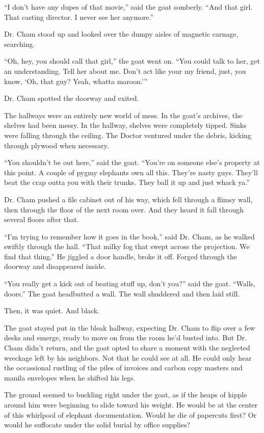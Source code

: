 \documentclass[12pt,twoside]{report}
\begin{document}
``I don't have any dupes of that movie,'' said the goat somberly.
``And that girl.  That casting director.  I never see her anymore.''

Dr. Cham stood up and looked over the dumpy aisles of magnetic
carnage, searching.

``Oh, hey, you should call that girl,'' the goat went on. ``You could
talk to her, get an understanding. Tell her about me.  Don't act like
your my friend, just, you know, `Oh, that guy? Yeah, whatta maroon.'''

Dr. Cham spotted the doorway and exited.

The hallways were an entirely new world of mess.  In the goat's
archives, the shelves had been messy. In the hallway, shelves were
completely tipped.  Sinks were falling through the ceiling.  The
Doctor ventured under the debris, kicking through plywood when
necessary.

``You shouldn't be out here,'' said the goat.  ``You're on someone
else's property at this point. A couple of pygmy elephants own all
this.  They're nasty guys.  They'll beat the crap outta you with their
trunks.  They ball it up and just whack ya.''

Dr. Cham pushed a file cabinet out of his way, which fell through a
flimsy wall, then through the floor of the next room over.  And they
heard it fall through several floors after that.

``I'm trying to remember how it goes in the book,'' said Dr. Cham, as
he walked swiftly through the hall.  ``That milky fog that swept
across the projection.  We find that thing.''  He jiggled a door
handle, broke it off.  Forged through the doorway and disappeared
inside.

``You really get a kick out of beating stuff up, don't you?'' said the
goat.  ``Walls, doors.'' The goat headbutted a wall.  The wall
shuddered and then laid still.

Then, it was quiet.  And black.

The goat stayed put in the bleak hallway, expecting Dr. Cham to flip
over a few desks and emerge, ready to move on from the room he'd
busted into.  But Dr. Cham didn't return, and the goat opted to share
a moment with the neglected wreckage left by his neighbors.  Not that
he could see at all. He could only hear the occassional rustling of
the piles of invoices and carbon copy masters and manila envelopes
when he shifted his legs.

The ground seemed to buckling right under the goat, as if the heaps of
kipple around him were beginning to slide toward his weight.  He would
be at the center of this whirlpool of elephant documentation.  Would
he die of papercuts first?  Or would he suffocate under the solid
burial by office supplies?
\end{document}
